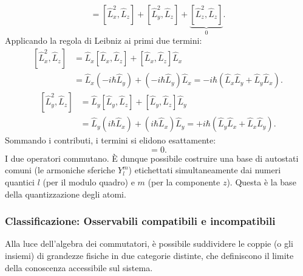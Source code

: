\documentclass[a4paper,11pt]{report}
\begin{document}
\begin{equation}
    [\hat{L}^2, \hat{L}_z] = [\hat{L}_x^2, \hat{L}_z] + [\hat{L}_y^2, \hat{L}_z] + \underbrace{[\hat{L}_z^2, \hat{L}_z]}_{0}.
\end{equation}
Applicando la regola di Leibniz ai primi due termini:
\begin{equation}
\begin{aligned}
    [\hat{L}_x^2, \hat{L}_z] &= \hat{L}_x[\hat{L}_x, \hat{L}_z] + [\hat{L}_x, \hat{L}_z]\hat{L}_x \\
    &= \hat{L}_x(-i\hbar \hat{L}_y) + (-i\hbar \hat{L}_y)\hat{L}_x = -i\hbar (\hat{L}_x \hat{L}_y + \hat{L}_y \hat{L}_x).
\end{aligned}
\end{equation}
\begin{equation}
\begin{aligned}
    [\hat{L}_y^2, \hat{L}_z] &= \hat{L}_y[\hat{L}_y, \hat{L}_z] + [\hat{L}_y, \hat{L}_z]\hat{L}_y \\
    &= \hat{L}_y(i\hbar \hat{L}_x) + (i\hbar \hat{L}_x)\hat{L}_y = +i\hbar (\hat{L}_y \hat{L}_x + \hat{L}_x \hat{L}_y).
\end{aligned}
\end{equation}
Sommando i contributi, i termini si elidono esattamente:
\begin{equation}
    [\hat{L}^2, \hat{L}_z] = 0.
\end{equation}
I due operatori commutano. È dunque possibile costruire una base di autostati comuni (le armoniche sferiche $Y_{l}^{m}$) etichettati simultaneamente dai numeri quantici $l$ (per il modulo quadro) e $m$ (per la componente $z$). Questa è la base della quantizzazione degli atomi.


\subsubsection{Classificazione: Osservabili compatibili e incompatibili}
Alla luce dell'algebra dei commutatori, è possibile suddividere le coppie (o gli insiemi) di grandezze fisiche in due categorie distinte, che definiscono il limite della conoscenza accessibile sul sistema.
\end{document}
